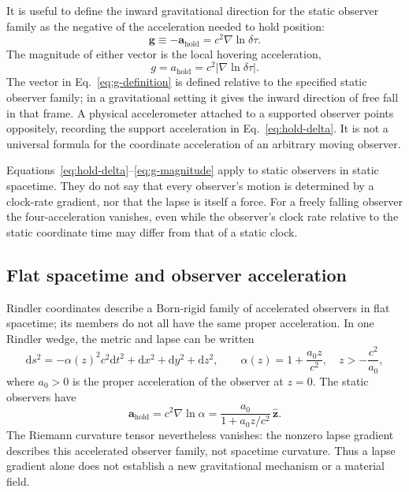 \documentclass[12pt]{article}
\begin{document}
It is useful to define the inward gravitational direction for the static observer family as the negative of the acceleration needed to hold position:
\begin{equation}
  \boxed{\mathbf{g}\equiv-\mathbf{a}_{\mathrm{hold}}
  =c^2\nabla\ln\delta\tau.}
  \label{eq:g-definition}
\end{equation}
The magnitude of either vector is the local hovering acceleration,
\begin{equation}
  g=a_{\mathrm{hold}}=c^2\left|\nabla\ln\delta\tau\right|.
  \label{eq:g-magnitude}
\end{equation}
The vector in Eq.~\eqref{eq:g-definition} is defined relative to the specified static observer family; in a gravitational setting it gives the inward direction of free fall in that frame. A physical accelerometer attached to a supported observer points oppositely, recording the support acceleration in Eq.~\eqref{eq:hold-delta}. It is not a universal formula for the coordinate acceleration of an arbitrary moving observer.

Equations~\eqref{eq:hold-delta}--\eqref{eq:g-magnitude} apply to static observers in static spacetime. They do not say that every observer's motion is determined by a clock-rate gradient, nor that the lapse is itself a force. For a freely falling observer the four-acceleration vanishes, even while the observer's clock rate relative to the static coordinate time may differ from that of a static clock.

\subsection{Flat spacetime and observer acceleration}

Rindler coordinates describe a Born-rigid family of accelerated observers in flat spacetime; its members do not all have the same proper acceleration. In one Rindler wedge, the metric and lapse can be written \cite{Rindler}
\begin{equation}
  \mathrm{d}s^2=-\alpha(z)^2c^2\mathrm{d}t^2
    +\mathrm{d}x^2+\mathrm{d}y^2+\mathrm{d}z^2,
  \qquad
  \alpha(z)=1+\frac{a_0z}{c^2},
  \quad z>-\frac{c^2}{a_0},
  \label{eq:rindler-metric}
\end{equation}
where $a_0>0$ is the proper acceleration of the observer at $z=0$. The static observers have
\begin{equation}
  \mathbf{a}_{\mathrm{hold}}
  =c^2\nabla\ln\alpha
  =\frac{a_0}{1+a_0z/c^2}\,\hat{\mathbf{z}}.
  \label{eq:rindler-acceleration}
\end{equation}
The Riemann curvature tensor nevertheless vanishes: the nonzero lapse gradient describes this accelerated observer family, not spacetime curvature. Thus a lapse gradient alone does not establish a new gravitational mechanism or a material field.
\end{document}
